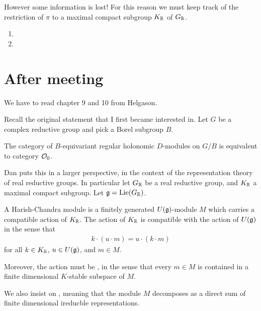 \documentclass[12pt]{article}
\begin{document}
\hfill

However some information is lost! For this reason we must keep track of the restriction of $\pi$ to a maximal compact subgroup $K_{\mathbb{R}}$ of $G_{\mathbb{R}}$.

\begin{enumerate}
    \item {}
    \item {}
\end{enumerate}

\section{After meeting}
We have to read chapter 9 and 10 from Helgason.

\hfill

Recall the original statement that I first became interested in. 
Let $G$ be a complex reductive group and pick a Borel subgroup $B$.

\begin{theorem}
    The category of $B$-equivariant regular 
    holonomic $D$-modules on $G/B$ is equivalent to category ${\mathcal{O}}_0$.
\end{theorem}

Dan puts this in a larger perspective, in the context of the 
representation theory of real reductive groups. In particular let 
$G_{\mathbb{R}}$ be a real reductive group, and $K_{\mathbb{R}}$ a maximal compact subgroup. 
Let $\mathfrak{g} = \operatorname{Lie}(G_{\mathbb{R}})$.

\begin{definition}
    A Harish-Chandra module is a finitely generated $U(\mathfrak{g})$-module $M$ which carries a compatible action of $K_{\mathbb{R}}$.
    The action of $K_{\mathbb{R}}$ is compatible with the action of $U(\mathfrak{g})$ in the sense that 
    \begin{align*}
        k \cdot (u \cdot m) = u \cdot (k \cdot m)
    \end{align*} for all $k \in K_{\mathbb{R}}$, $u \in U(\mathfrak{g})$, and $m \in M$.

    Moreover, the action must be , in 
    the sense that every $m \in M$ is contained in a finite dimensional $K$-stable subspace of $M$.

    We also insist on , meaning that the module $M$ decomposes
    as a direct sum of finite dimensional ireducble representations.
\end{definition}
\end{document}
